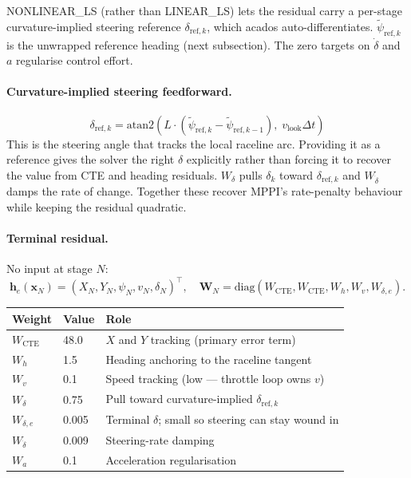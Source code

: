 \documentclass[11pt]{article}
\begin{document}
NONLINEAR\_LS (rather than LINEAR\_LS) lets the residual carry a per-stage
curvature-implied steering reference $\delta_{\text{ref},k}$, which acados
auto-differentiates.  $\tilde{\psi}_{\text{ref},k}$ is the unwrapped
reference heading (next subsection).  The zero targets on $\dot{\delta}$ and
$a$ regularise control effort.

\paragraph{Curvature-implied steering feedforward.}
\[
\delta_{\text{ref},k} =
  \mathrm{atan2}\!\left(L \cdot (\tilde{\psi}_{\text{ref},k} - \tilde{\psi}_{\text{ref},k-1}),\;
                       v_{\text{look}}\Delta t\right)
\]
This is the steering angle that tracks the local raceline arc.  Providing it
as a reference gives the solver the right $\delta$ explicitly rather than
forcing it to recover the value from CTE and heading residuals.  $W_\delta$
pulls $\delta_k$ toward $\delta_{\text{ref},k}$ and $W_{\dot\delta}$ damps
the rate of change.  Together these recover MPPI's rate-penalty behaviour
while keeping the residual quadratic.

\paragraph{Terminal residual.}  No input at stage $N$:
\[
\bm{h}_e(\bm{x}_N) = (X_N, Y_N, \psi_N, v_N, \delta_N)^{\!\top},
\quad
\bm{W}_N = \mathrm{diag}(W_{\text{CTE}}, W_{\text{CTE}}, W_h, W_v, W_{\delta,e}).
\]

\medskip
\begin{center}
\begin{tabular}{lll}
\toprule
Weight & Value & Role \\
\midrule
$W_{\text{CTE}}$      & 48.0  & $X$ and $Y$ tracking (primary error term) \\
$W_h$                 & 1.5   & Heading anchoring to the raceline tangent \\
$W_v$                 & 0.1   & Speed tracking (low --- throttle loop owns $v$) \\
$W_\delta$            & 0.75  & Pull toward curvature-implied $\delta_{\text{ref},k}$ \\
$W_{\delta,e}$        & 0.005 & Terminal $\delta$; small so steering can stay wound in \\
$W_{\dot\delta}$      & 0.009 & Steering-rate damping \\
$W_a$                 & 0.1   & Acceleration regularisation \\
\bottomrule
\end{tabular}
\end{center}
\end{document}
